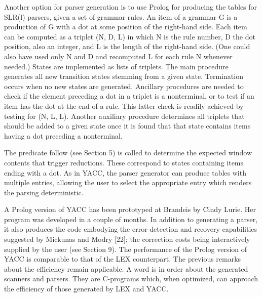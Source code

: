 Another option for parser generation is to use Prolog for producing the tables
for SLR(l) parsers, given a set of grammar rules. An item of a grammar G is a
production of G with a dot at some position of the right-hand side. Each item
can be computed as a triplet (N, D, L) in which N is the rule number, D the dot
position, also an integer, and L is the length of the right-hand side. (One could
also have used only N and D and recomputed L for each rule N whenever needed.)
States are implemented as lists of triplets. The main procedure generates all new
transition states stemming from a given state. Termination occurs when no new
states are generated. Ancillary procedures are needed to check if the element
preceding a dot in a triplet is a nonterminal, or to test if an item has the dot at
the end of a rule. This latter check is readily achieved by testing for (N, L, L).
Another auxiliary procedure determines all triplets that should be added to a
given state once it is found that that state contains items having a dot preceding
a nonterminal. 

The predicate follow (see Section 5) is called to determine the expected window
contents that trigger reductions. These correspond to states containing items
ending with a dot. As in YACC, the parser generator can produce tables with
multiple entries, allowing the user to select the appropriate entry which renders
the parsing deterministic. 

A Prolog version of YACC has been prototyped at Brandeis by Cindy Lurie.
Her program was developed in a couple of months. In addition to generating a
parser, it also produces the code embodying the error-detection and recovery
capabilities suggested by Mickunas and Modry [22]; the correction costs being
interactively supplied by the user (see Section 9). The performance of the Prolog
version of YACC is comparable to that of the LEX counterpart. The previous
remarks about the efficiency remain applicable. A word is in order about the
generated scanners and parsers. They are C-programs which, when optimized,
can approach the efficiency of those generated by LEX and YACC. 

   
 
\secup